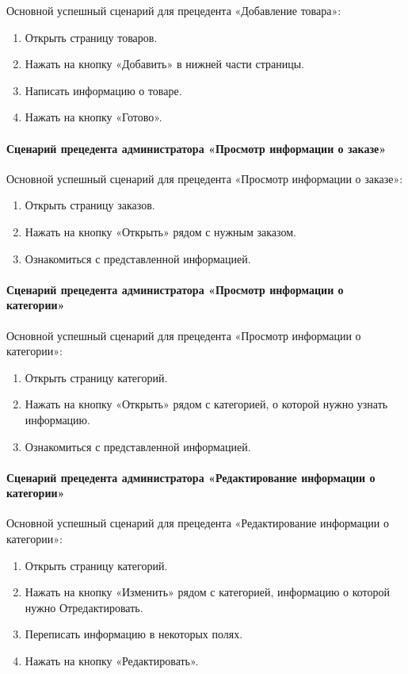 Основной успешный сценарий для прецедента «Добавление товара»:
\begin{enumerate}
	\item Открыть страницу товаров.
	\item Нажать на кнопку «Добавить» в нижней части страницы.
	\item Написать информацию о товаре.
	\item Нажать на кнопку «Готово».
\end{enumerate}

\paragraph{Сценарий прецедента администратора «Просмотр информации о заказе»}

Основной успешный сценарий для прецедента «Просмотр информации о заказе»:
\begin{enumerate}
	\item Открыть страницу заказов.
	\item Нажать на кнопку «Открыть» рядом с нужным заказом.
	\item Ознакомиться с представленной информацией.
\end{enumerate}

\paragraph{Сценарий прецедента администратора «Просмотр информации о категории»}

Основной успешный сценарий для прецедента «Просмотр информации о категории»:
\begin{enumerate}
	\item Открыть страницу категорий.
	\item Нажать на кнопку «Открыть» рядом с категорией, о которой нужно узнать информацию.
	\item Ознакомиться с представленной информацией.
\end{enumerate}

\paragraph{Сценарий прецедента администратора «Редактирование информации о категории»}

Основной успешный сценарий для прецедента «Редактирование информации о категории»:
\begin{enumerate}
	\item Открыть страницу категорий.
	\item Нажать на кнопку «Изменить» рядом с категорией, информацию о которой нужно Отредактировать.
	\item Переписать информацию в некоторых полях.
	\item Нажать на кнопку «Редактировать».
\end{enumerate}

